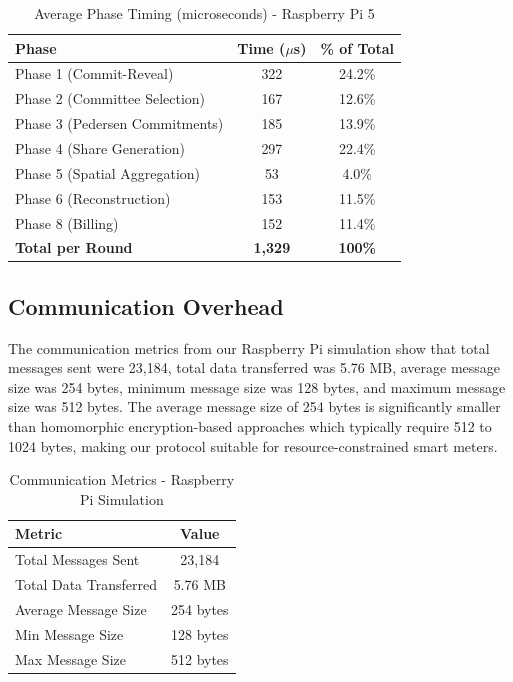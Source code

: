 \documentclass[conference]{IEEEtran}
\begin{document}
\begin{table}[h]
\centering
\caption{Average Phase Timing (microseconds) - Raspberry Pi 5}
\label{tab:timing}
\begin{tabular}{|l|c|c|}
\hline
\textbf{Phase} & \textbf{Time ($\mu$s)} & \textbf{\% of Total} \\
\hline
Phase 1 (Commit-Reveal) & 322 & 24.2\% \\
Phase 2 (Committee Selection) & 167 & 12.6\% \\
Phase 3 (Pedersen Commitments) & 185 & 13.9\% \\
Phase 4 (Share Generation) & 297 & 22.4\% \\
Phase 5 (Spatial Aggregation) & 53 & 4.0\% \\
Phase 6 (Reconstruction) & 153 & 11.5\% \\
Phase 8 (Billing) & 152 & 11.4\% \\
\hline
\textbf{Total per Round} & \textbf{1,329} & \textbf{100\%} \\
\hline
\end{tabular}
\end{table}

\subsection{Communication Overhead}

The communication metrics from our Raspberry Pi simulation show that total messages sent were 23,184, total data transferred was 5.76 MB, average message size was 254 bytes, minimum message size was 128 bytes, and maximum message size was 512 bytes. The average message size of 254 bytes is significantly smaller than homomorphic encryption-based approaches which typically require 512 to 1024 bytes, making our protocol suitable for resource-constrained smart meters.

\begin{table}[h]
\centering
\caption{Communication Metrics - Raspberry Pi Simulation}
\label{tab:comm}
\begin{tabular}{|l|c|}
\hline
\textbf{Metric} & \textbf{Value} \\
\hline
Total Messages Sent & 23,184 \\
Total Data Transferred & 5.76 MB \\
Average Message Size & 254 bytes \\
Min Message Size & 128 bytes \\
Max Message Size & 512 bytes \\
\hline
\end{tabular}
\end{table}
\end{document}

